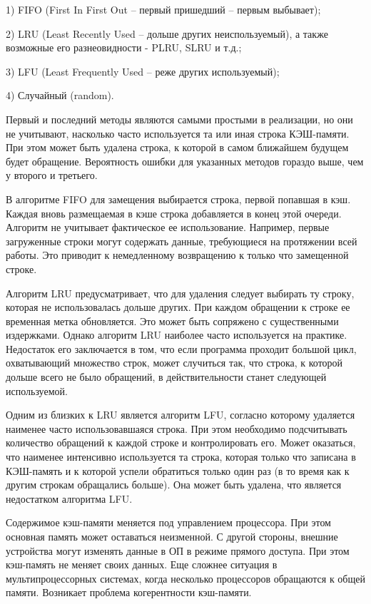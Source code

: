 \documentclass[13pt]{article}
\begin{document}
1) FIFO (First In First Out – первый пришедший – первым выбывает);

2) LRU (Least Recently Used – дольше других неиспользуемый), а также возможные его разнеовидности - PLRU, SLRU и т.д.;

3) LFU (Least Frequently Used – реже других используемый);

4) Случайный (random).

Первый и последний методы являются самыми простыми в реализации, но они не учитывают, насколько часто используется та или иная строка КЭШ-памяти. При этом может быть удалена строка, к которой в самом ближайшем будущем будет обращение. Вероятность ошибки для указанных методов гораздо выше, чем у второго и третьего.

В алгоритме FIFO для замещения выбирается строка, первой попавшая в кэш. Каждая вновь размещаемая в кэше строка добавляется в конец этой очереди. Алгоритм не учитывает фактическое ее использование. Например, первые загруженные строки могут содержать данные, требующиеся на протяжении всей работы. Это приводит к немедленному возвращению к только что замещенной строке.

Алгоритм LRU предусматривает, что для удаления следует выбирать ту строку, которая не использовалась дольше других. При каждом обращении к строке ее временная метка обновляется. Это может быть сопряжено с существенными издержками. Однако алгоритм LRU наиболее часто используется на практике. Недостаток его заключается в том, что если программа проходит большой цикл, охватывающий множество строк, может случиться так, что строка, к которой дольше всего не было обращений, в действительности станет следующей используемой.

Одним из близких к LRU является алгоритм LFU, согласно которому удаляется наименее часто использовавшаяся строка. При этом необходимо подсчитывать количество обращений к каждой строке и контролировать его. Может оказаться, что наименее интенсивно используется та строка, которая только что записана в КЭШ-память и к которой успели обратиться только один раз (в то время как к другим строкам обращались больше). Она может быть удалена, что является недостатком алгоритма LFU.

Содержимое кэш-памяти меняется под управлением процессора. При этом основная память может оставаться неизменной. С другой стороны, внешние устройства могут изменять данные в ОП в режиме прямого доступа. При этом кэш-память не меняет своих данных. Еще сложнее ситуация в мультипроцессорных системах, когда несколько процессоров обращаются к общей памяти. Возникает проблема когерентности кэш-памяти.
\end{document}
